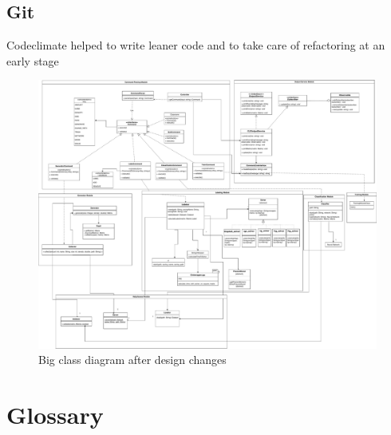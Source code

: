 \documentclass[parskip=full]{scrartcl}
\begin{document}
\subsection{Git}
Codeclimate helped to write leaner code and to take care of refactoring at an early stage



\newpage

\begin{figure}
    \includegraphics[width=\textwidth, height= \textheight, keepaspectratio]{../Big_classdiagram/Big_classdiagram.pdf}
    \caption{Big class diagram after design changes}
    \label{fig:PropProf}
\end{figure}


\newpage
\section{Glossary}

%
\printnoidxglossaries
\end{document}
